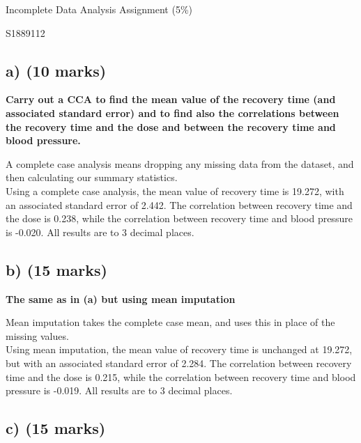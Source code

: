 \documentclass{article}
\numberwithin{equation}{section} %
\begin{document}
	\begin{titlepage}
		\centering
		{\LARGE\bfseries } \par
		\vspace{5mm}
		{\huge Incomplete Data Analysis Assignment (5\%)}\par
		\vspace{5mm}
		\large{S1889112}
	\end{titlepage}
	\newpage	
	

\subsection*{a) (10 marks)} 

\textbf{Carry out a CCA to find the mean value of the recovery time (and associated standard error) and to find also the correlations between the recovery time and the dose and between the recovery time and blood pressure.}

\vspace{5mm}

A complete case analysis means dropping any missing data from the dataset, and then calculating our summary statistics. \\

Using a complete case analysis, the mean value of recovery time is 19.272, with an associated standard error of 2.442. The correlation between recovery time and the dose is 0.238, while the correlation between recovery time and blood pressure is -0.020. All results are to 3 decimal places. 


\subsection*{b) (15 marks)} 

\textbf{The same as in (a) but using mean imputation}

\vspace{5mm}

Mean imputation takes the complete case mean, and uses this in place of the missing values. \\

Using mean imputation, the mean value of recovery time is unchanged at 19.272, but with an associated standard error of 2.284. The correlation between recovery time and the dose is 0.215, while the correlation between recovery time and blood pressure is -0.019. All results are to 3 decimal places. 

\subsection*{c) (15 marks)} 
\end{document}
